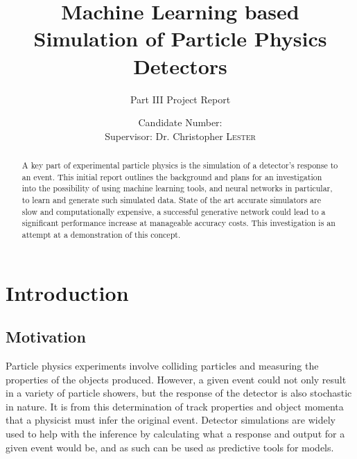 \documentclass{report}
\title{Machine Learning based Simulation of Particle Physics Detectors}
\subtitle{Part III Project Report}
\author{Candidate Number: \\
Supervisor: Dr. Christopher \textsc{Lester}}
\date{\printdate{2017-05-15}}
\begin{document}
\begin{titlepage}
\maketitle


%
%
%

\end{titlepage}

\begin{abstract}
A key part of experimental particle physics is the simulation of a detector's response to an event. This initial report outlines the background and plans for an investigation into the possibility of using machine learning tools, and neural networks in particular, to learn and generate such simulated data. State of the art accurate simulators are slow and computationally expensive, a successful generative network could lead to a significant performance increase at manageable accuracy costs. This investigation is an attempt at a demonstration of this concept.
\end{abstract}

\chapter{Introduction}

\section{Motivation}
Particle physics experiments involve colliding particles and measuring the properties of the objects produced. However, a given event could not only result in a variety of particle showers, but the response of the detector is also stochastic in nature. It is from this determination of track properties and object momenta that a physicist must infer the original event. Detector simulations are widely used to help with the inference by calculating what a response and output for a given event would be, and as such can be used as predictive tools for models.\\
\end{document}
